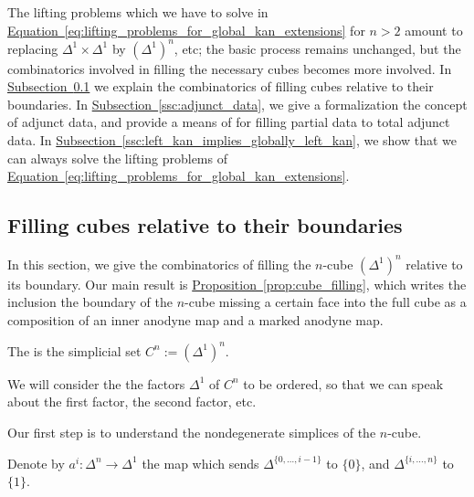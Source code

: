 \documentclass[main.tex]{subfiles}
\begin{document}
The lifting problems which we have to solve in \hyperref[eq:lifting_problems_for_global_kan_extensions]{Equation~\ref*{eq:lifting_problems_for_global_kan_extensions}} for $n > 2$ amount to replacing $\Delta^{1} \times \Delta^{1}$ by $(\Delta^{1})^{n}$, etc; the basic process remains unchanged, but the combinatorics involved in filling the necessary cubes becomes more involved. In \hyperref[ssc:filling_cubes_relative_to_their_boundary]{Subsection~\ref*{ssc:filling_cubes_relative_to_their_boundary}} we explain the combinatorics of filling cubes relative to their boundaries. In \hyperref[ssc:adjunct_data]{Subsection~\ref*{ssc:adjunct_data}}, we give a formalization the concept of adjunct data, and provide a means of for filling partial data to total adjunct data. In \hyperref[ssc:left_kan_implies_globally_left_kan]{Subsection~\ref*{ssc:left_kan_implies_globally_left_kan}}, we show that we can always solve the lifting problems of \hyperref[eq:lifting_problems_for_global_kan_extensions]{Equation~\ref*{eq:lifting_problems_for_global_kan_extensions}}.

\subsection{Filling cubes relative to their boundaries}
\label{ssc:filling_cubes_relative_to_their_boundary}

In this section, we give the combinatorics of filling the $n$-cube $(\Delta^{1})^{n}$ relative to its boundary. Our main result is \hyperref[prop:cube_filling]{Proposition~\ref*{prop:cube_filling}}, which writes the inclusion the boundary of the $n$-cube missing a certain face into the full cube as a composition of an inner anodyne map and a marked anodyne map.

\begin{definition}
  The  is the simplicial set $C^{n} := (\Delta^{1})^{n}$.
\end{definition}

\begin{note}
  We will consider the the factors $\Delta^{1}$ of $C^{n}$ to be ordered, so that we can speak about the first factor, the second factor, etc.
\end{note}

Our first step is to understand the nondegenerate simplices of the $n$-cube.

\begin{definition}
  Denote by $a^{i}\colon \Delta^{n} \to \Delta^{1}$ the map which sends $\Delta^{\{0, \ldots, i-1\}}$ to $\{0\}$, and $\Delta^{\{i, \ldots, n\}}$ to $\{1\}$.
\end{definition}
\end{document}
